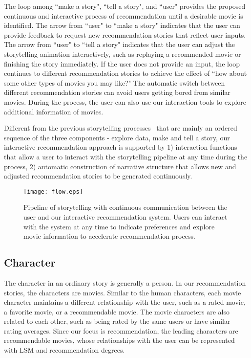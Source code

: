 \documentclass{vgtc}                          %
\begin{document}
The loop among ``make a story", ``tell a story", and ``user" provides the proposed continuous and interactive process of recommendation until a desirable movie is identified.
The arrow from ``user" to ``make a story" indicates that the user can provide feedback to request new recommendation stories that reflect user inputs.
The arrow from ``user" to ``tell a story" indicates that the user can  adjust the storytelling animation interactively, such as replaying a recommended movie or finishing the story immediately.
If the user does not provide an input, the loop continues to different recommendation stories to achieve the effect of ``how about some other types of movies you may like?"
The automatic switch between different recommendation stories can avoid users getting bored from similar movies.
During the process, the user can also use our interaction tools to explore additional information of movies.

Different from the previous storytelling processes~\cite{7274435} that are mainly an ordered sequence of the three components - explore data, make and tell a story, our interactive recommendation approach is supported by 1) interaction functions that allow a user to interact with the storytelling pipeline at any time during the process, 2) automatic construction of narrative structure that allows new and adjusted recommendation stories to be generated continuously.


\begin{figure}
\centering
\texttt{[image: flow.eps]}
\caption{Pipeline of storytelling with continuous communication between the user and our interactive recommendation system.
Users can interact with the system at any time to indicate preferences and explore movie information to accelerate recommendation process.
}
\label{IT}
\end{figure}

\subsection{Character}

The character in an ordinary story is generally a person. 
In our recommendation stories, the characters are movies.
Similar to the human characters, each movie character maintains a different relationship with the user, such as a rated movie, a favorite movie, or a recommendable movie.
The movie characters are also related to each other, such as being rated by the same users or have similar rating averages.
Since our focus is recommendation, the leading characters are recommendable movies, whose relationships with the user can be represented with LSM and recommendation degrees.
\end{document}

